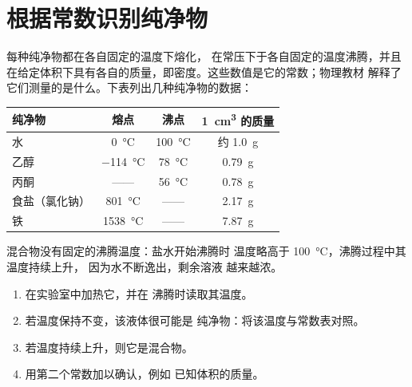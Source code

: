 \section{根据常数识别纯净物}

\begin{proposition}[纯净物有其自身的常数]\label{prop:g6:pure-substances-and-mixtures:constants}
每种纯净物都在各自固定的温度下熔化，
在常压下于各自固定的温度沸腾，并且
在给定体积下具有各自的质量，即密度。这些数值是它的常数；物理教材
解释了它们测量的是什么。下表列出几种纯净物的数据：
\begin{center}
\small
\begin{tabular}{lccc}
\hline
纯净物 & 熔点 & 沸点 & \qty{1}{cm^3} 的质量 \\
\hline
水 & \qty{0}{\celsius} & \qty{100}{\celsius} & 约 \qty{1.0}{g} \\
乙醇 & \qty{-114}{\celsius} & \qty{78}{\celsius} & \qty{0.79}{g} \\
丙酮 &——& \qty{56}{\celsius} & \qty{0.78}{g} \\
食盐（氯化钠） & \qty{801}{\celsius} &——& \qty{2.17}{g} \\
铁 & \qty{1538}{\celsius} &——& \qty{7.87}{g} \\
\hline
\end{tabular}
\end{center}
\end{proposition}

\begin{proposition}[混合物没有固定的沸点]\label{prop:g6:pure-substances-and-mixtures:mixture-boils}
混合物没有固定的沸腾温度：盐水开始沸腾时
温度略高于 \qty{100}{\celsius}，沸腾过程中其温度持续上升，
因为水不断逸出，剩余溶液
越来越浓。
\end{proposition}

\begin{method}\label{met:g6:pure-substances-and-mixtures:identify}
\begin{enumerate}
  \item 在实验室中加热它，并在
        沸腾时读取其温度。
  \item 若温度保持不变，该液体很可能是
        纯净物：将该温度与常数表对照。
  \item 若温度持续上升，则它是混合物。
  \item 用第二个常数加以确认，例如
        已知体积的质量。
\end{enumerate}
\end{method}

